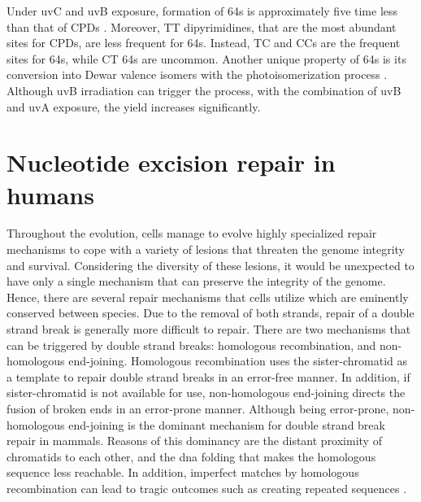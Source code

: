 Under \gls{uv}C and \gls{uv}B exposure, formation of \gls{64}s is approximately five time less than that of \gls{CPD}s \citep{douki2001individual}. Moreover, \gls{T}\gls{T} dipyrimidines, that are the most abundant sites for \gls{CPD}s, are less frequent for \gls{64}s. Instead, \gls{T}\gls{C} and \gls{C}\gls{C}s are the frequent sites for \gls{64}s, while \gls{C}\gls{T} \gls{64}s are uncommon. Another unique property of \gls{64}s is its conversion into Dewar valence isomers with the photoisomerization process \citep{taylor1987dna}. Although \gls{uv}B irradiation can trigger the process, with the combination of \gls{uv}B and \gls{uv}A exposure, the yield increases significantly.

\section{Nucleotide excision repair in humans}

Throughout the evolution, cells manage to evolve highly specialized repair mechanisms to cope with a variety of lesions that threaten the genome integrity and survival. Considering the diversity of these lesions, it would be unexpected to have only a single mechanism that can preserve the integrity of the genome. Hence, there are several repair mechanisms that cells utilize which are eminently conserved between species. Due to the removal of both strands, repair of a double strand break is generally more difficult to repair. There are two mechanisms that can be triggered by double strand breaks: homologous recombination, and non-homologous end-joining. Homologous recombination uses the sister-chromatid as a template to repair double strand breaks in an error-free manner. In addition, if sister-chromatid is not available for use, non-homologous end-joining directs the fusion of broken ends in an error-prone manner. Although being error-prone, non-homologous end-joining is the dominant mechanism for double strand break repair in mammals. Reasons of this dominancy are the distant proximity of chromatids to each other, and the \gls{dna} folding that makes the homologous sequence less reachable. In addition, imperfect matches by homologous recombination can lead to tragic outcomes such as creating repeated sequences \citep{li2018mismatch}.

